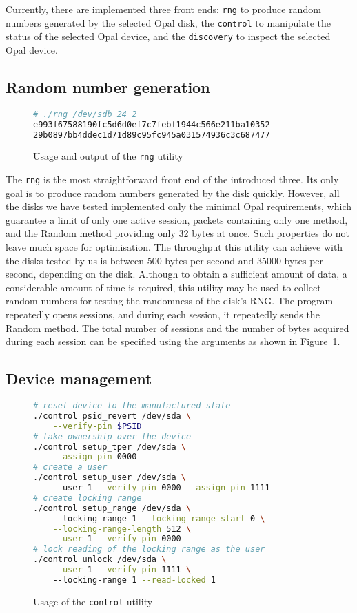 Currently, there are implemented three front ends: \verb|rng| to produce random numbers generated by the selected Opal disk, the \verb|control| to manipulate the status of the selected Opal device, and the \verb|discovery| to inspect the selected Opal device.

\subsection{Random number generation}

\begin{figure}
    \centering
\begin{lstlisting}[language=Bash]
# ./rng /dev/sdb 24 2
e993f67588190fc5d6d0ef7c7febf1944c566e211ba10352
29b0897bb4ddec1d71d89c95fc945a031574936c3c687477
\end{lstlisting}
    \caption{Usage and output of the \texttt{rng} utility}
    \label{fig:rng_output}
\end{figure}

The \verb|rng| is the most straightforward front end of the introduced three. Its only goal is to produce random numbers generated by the disk quickly. However, all the disks we have tested implemented only the minimal Opal requirements, which guarantee a limit of only one active session, packets containing only one method, and the Random method providing only 32 bytes at once. Such properties do not leave much space for optimisation. The throughput this utility can achieve with the disks tested by us is between 500 bytes per second and 35000 bytes per second, depending on the disk. Although to obtain a sufficient amount of data, a considerable amount of time is required, this utility may be used to collect random numbers for testing the randomness of the disk's RNG.
The program repeatedly opens sessions, and during each session, it repeatedly sends the Random method. The total number of sessions and the number of bytes acquired during each session can be specified using the arguments as shown in Figure~\ref{fig:rng_output}.

\subsection{Device management}

\begin{figure}
    \centering
    \begin{lstlisting}[language=bash]
# reset device to the manufactured state
./control psid_revert /dev/sda \
    --verify-pin $PSID
# take ownership over the device
./control setup_tper /dev/sda \
    --assign-pin 0000
# create a user
./control setup_user /dev/sda \ 
    --user 1 --verify-pin 0000 --assign-pin 1111
# create locking range
./control setup_range /dev/sda \ 
    --locking-range 1 --locking-range-start 0 \
    --locking-range-length 512 \
    --user 1 --verify-pin 0000
# lock reading of the locking range as the user
./control unlock /dev/sda \
    --user 1 --verify-pin 1111 \ 
    --locking-range 1 --read-locked 1
    \end{lstlisting}
    \caption{Usage of the \texttt{control} utility}
    \label{fig:control_output}
\end{figure}


